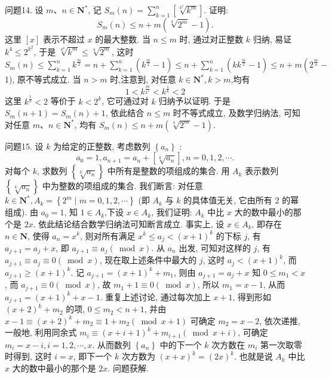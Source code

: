 问题14. 设 $m 、 n \in \mathbf{N}^*$, 记 $S_m(n)=\sum_{k=1}^n\left[\sqrt[k^2]{k^m}\right]$. 证明:
$$
S_m(n) \leqslant n+m\left(\sqrt[4]{2^m}-1\right) .
$$
这里 $[x]$ 表示不超过 $x$ 的最大整数.
当 $n \leqslant m$ 时, 通过对正整数 $k$ 归纳, 易证 $k^4 \leqslant 2^{k^2}$, 于是 $\sqrt[k^2]{k^m} \leqslant \sqrt[4]{2^m}$, 这时 $S_m(n) \leqslant \sum_{k=1}^n k^{\frac{m}{2}}=n+\sum_{k=1}^n\left(k^{\frac{m}{2}}-1\right) \leqslant n+\sum_{k=1}^n\left(k k^{\frac{m}{2}}-1\right) \leqslant n+m\left(2^{\frac{m}{4}}-\right.$ 1), 原不等式成立.
当 $n>m$ 时,注意到, 对任意 $k \in \mathbf{N}^*, k>m$,均有
$$
1<k^{\frac{m}{k^2}}<k^{\frac{1}{k}}<2
$$
这里 $k^{\frac{1}{k}}<2$ 等价于 $k<2^k$, 它可通过对 $k$ 归纳予以证明.
于是 $S_m(n+1)= S_m(n)+1$, 依此结合 $n \leqslant m$ 时不等式成立, 及数学归纳法, 可知对任意 $m 、 n \in \mathbf{N}^*$, 均有 $S_m(n) \leqslant n+m\left(\sqrt[4]{2^m}-1\right)$.



问题15. 设 $k$ 为给定的正整数, 考虑数列 $\left\{a_n\right\}$ :
$$
a_0=1, a_{n+1}=a_n+\left[\sqrt[k]{a_n}\right], n=0,1,2, \cdots .
$$
对每个 $k$, 求数列 $\left\{\sqrt[k]{a_n}\right\}$ 中所有是整数的项组成的集合.
用 $A_k$ 表示数列 $\left\{\sqrt[k]{a_n}\right\}$ 中为整数的项组成的集合.
我们断言: 对任意 $k \in \mathbf{N}^*, A_k=\left\{2^m \mid m=0,1,2, \cdots\right\}$ (即 $A_k$ 与 $k$ 的具体值无关, 它由所有 2 的幂组成).
由 $a_0=1$, 知 $1 \in A_k$,下设 $x \in A_k$, 我们证明: $A_k$ 中比 $x$ 大的数中最小的那个是 $2 x$. 依此结论结合数学归纳法可知断言成立.
事实上, 设 $x \in A_k$, 即存在 $n \in \mathbf{N}$, 使得 $a_n=x^k$, 则对所有满足 $x^k \leqslant a_j< (x+1)^k$ 的下标 $j$, 有 $a_{j+1}=a_j+x$, 即 $a_{j+1} \equiv a_j(\bmod x)$. 从 $a_n$ 出发, 可知对这样的 $j$, 有 $a_{j+1} \equiv a_j \equiv 0(\bmod x)$, 现在取上述条件中最大的 $j$, 这时 $a_j<(x+ 1)^k$, 而 $a_{j+1} \geqslant(x+1)^k$. 记 $a_{j+1}=(x+1)^k+m_1$, 则由 $a_{j+1}=a_j+x$ 知 $0 \leqslant m_1<x$, 而 $a_{j+1} \equiv 0(\bmod x)$, 故 $m_1+1 \equiv 0(\bmod x)$, 所以 $m_1=x-1$, 从而 $a_{j+1}=(x+1)^k+x-1$.
重复上述讨论, 通过每次加上 $x+1$, 得到形如 $(x+2)^k+m_2$ 的项, $0 \leqslant m_2<n+1$, 并由 $x-1 \equiv(x+2)^k+m_2 \equiv 1+m_2(\bmod x+1)$ 可确定 $m_2= x-2$, 依次递推, 一般地, 利用同余式 $m_i \equiv(x+i+1)^k+m_{i+1}(\bmod x+i)$, 可确定 $m_i=x-i, i=1,2, \cdots, x$. 从而数列 $\left\{a_n\right\}$ 中的下一个 $k$ 次方数在 $m_i$ 第一次取零时得到, 这时 $i=x$, 即下一个 $k$ 次方数为 $(x+x)^k=(2 x)^k$. 也就是说 $A_k$ 中比 $x$ 大的数中最小的那个是 $2 x$.
问题获解.



